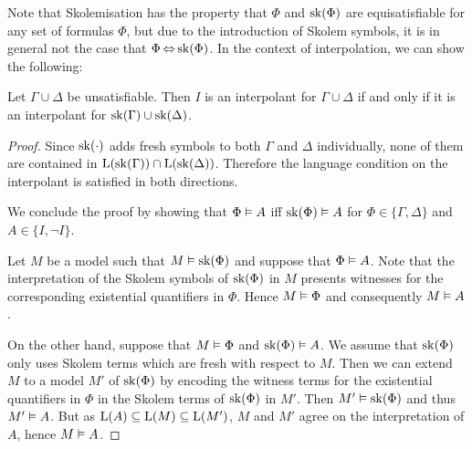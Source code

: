 Note that Skolemisation has the property that $\Phi$ and $\operatorname{sk}(\Phi)$ are equisatisfiable for any set of formulas $\Phi$, but due to the introduction of Skolem symbols, it is in general not the case that $\Phi \operatorname{\Leftrightarrow} \operatorname{sk}(\Phi)$.
In the context of interpolation, we can show the following:

\begin{prop}
	\label{prop:sk_interpolant}
	Let $\Gamma \cup \Delta$ be unsatisfiable.
	Then $I$ is an interpolant for $\Gamma \cup \Delta$ if and only if it is an interpolant for $\operatorname{sk}(\Gamma) \cup \operatorname{sk}(\Delta)$. 
\end{prop}

\begin{proof}
	Since $\operatorname{sk}(\cdot)$ adds fresh symbols to both $\Gamma$ and $\Delta$ individually,
	none of them are contained in $\operatorname{L}(\operatorname{sk}(\Gamma)) \cap \operatorname{L}(\operatorname{sk}(\Delta))$.
	Therefore the language condition on the interpolant is satisfied in both directions.



	We conclude the proof by showing that $\Phi \vDash A$ iff $\operatorname{sk}(\Phi) \vDash A$ for $\Phi \in \{\Gamma, \Delta\}$ and $A \in \{I, \lnot I\}$.

	Let $M$ be a model such that $M \vDash \operatorname{sk}(\Phi)$ and suppose that $\Phi \vDash A$.
	Note that the interpretation of the Skolem symbols of $\operatorname{sk}(\Phi)$ in $M$ presents witnesses for the corresponding existential quantifiers in $\Phi$.
	Hence $M \vDash \Phi$ and consequently $M\vDash A$.

	On the other hand, suppose that $M \vDash \Phi$ and $\operatorname{sk}(\Phi) \vDash A$.
	We assume that $\operatorname{sk}(\Phi)$ only uses Skolem terms which are fresh with respect to $M$.
	Then we can extend $M$ to a model $M'$ of $\operatorname{sk}(\Phi)$ by encoding the witness terms for the existential quantifiers in $\Phi$ in the Skolem terms of $\operatorname{sk}(\Phi)$ in $M'$.
	Then $M' \vDash \operatorname{sk}(\Phi)$ and thus $M' \vDash A$.
	But as $\operatorname{L}(A) \subseteq \operatorname{L}(M) \subseteq \operatorname{L}(M')$, $M$ and $M'$ agree on the interpretation of $A$, hence $M \vDash A$.
\end{proof}


